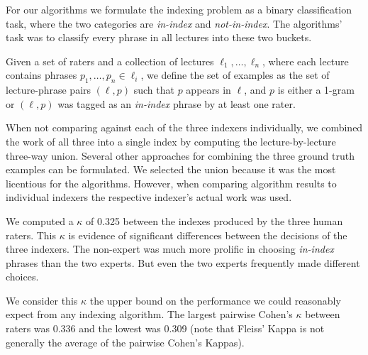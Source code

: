 For our algorithms we formulate the indexing problem as a binary
classification task, where the two categories are {\em in-index} and
{\em not-in-index}. The algorithms' task was to classify every phrase in
all lectures into these two buckets.

Given a set of raters and a collection of lectures $\ell_1, \ldots,
\ell_n$, where each lecture contains phrases $p_1, \ldots, p_n \in
\ell_i$, we define the set of examples as the set of lecture-phrase
pairs $(\ell, p)$ such that $p$ appears in $\ell$, and $p$ is either a
1-gram or $(\ell, p)$ was tagged as an {\em in-index} phrase by at
least one rater.

When not comparing against each of the three indexers individually, we
combined the work of all three into a single index by computing the
lecture-by-lecture three-way union. Several other approaches for
combining the three ground truth examples can be formulated. We
selected the union because it was the most licentious for the
algorithms. However, when comparing algorithm results to individual
indexers the respective indexer's actual work was used.

We computed a $\kappa$ of 0.325 between the indexes produced by the
three human raters. This $\kappa$ is evidence of significant
differences between the decisions of the three indexers. The
non-expert was much more prolific in choosing {\em in-index} phrases
than the two experts. But even the two experts frequently made
different choices.

We consider this $\kappa$ the upper bound on the performance we could
reasonably expect from any indexing algorithm. The largest pairwise
Cohen's $\kappa$ between raters was 0.336 and the lowest was 0.309
(note that Fleiss' Kappa is not generally the average of the pairwise
Cohen's Kappas).
